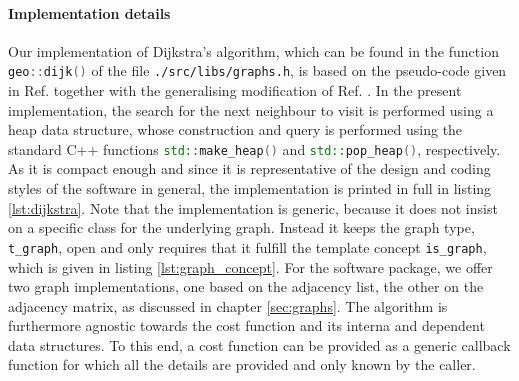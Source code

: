\paragraph{Implementation details}
Our implementation of Dijkstra's algorithm, which can be found in the function 
\lstinline[language=C++]|geo::dijk()| of the file \lstinline|./src/libs/graphs.h|, is based on the 
pseudo-code given in Ref. \cite[p. 17]{FUH_algo_graphs_2021} together with the generalising modification of 
Ref. \cite[p. 285]{Erickson2019}. In the present implementation, the search for the next neighbour
to visit is performed using a heap data structure, whose construction and query is performed
using the standard C++ functions \lstinline[language=C++]|std::make_heap()| and 
\lstinline[language=C++]|std::pop_heap()|, respectively.
As it is compact enough and since it is representative of the design and coding styles of the software
in general, the implementation is printed in full in listing \ref{lst:dijkstra}.
Note that the implementation is generic, because it does not insist on a specific class
for the underlying graph. Instead it keeps the graph type, \lstinline[language=C++]|t_graph|, open and
only requires that it fulfill the template concept \cite{cppwiki_concepts}
\lstinline[language=C++]|is_graph|, which is given in listing \ref{lst:graph_concept}.
For the software package, we offer two graph implementations, one based on the adjacency list, the
other on the adjacency matrix, as discussed in chapter \ref{sec:graphs}.
The algorithm is furthermore agnostic towards the cost function and its interna and dependent 
data structures. To this end, a cost function can be provided as a generic callback function 
for which all the details are provided and only known by the caller.


